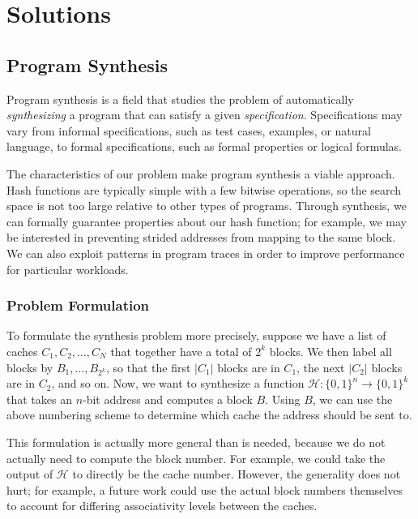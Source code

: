 \section{Solutions}
\label{sec:Solution}

\subsection{Program Synthesis}

Program synthesis \cite{program-synthesis-survey} is a field that studies the
problem of automatically \textit{synthesizing} a program that can satisfy a
given \textit{specification}. Specifications may vary from informal
specifications, such as test cases, examples, or natural language, to formal
specifications, such as formal properties or logical formulas.

The characteristics of our problem make program synthesis a viable approach.
Hash functions are typically simple with a few bitwise operations, so the search
space is not too large relative to other types of programs. Through synthesis,
we can formally guarantee properties about our hash function; for example, we
may be interested in preventing strided addresses from mapping to the same
block. We can also exploit patterns in program traces in order to improve
performance for particular workloads.

\subsubsection{Problem Formulation}

To formulate the synthesis problem more precisely, suppose we have a list of
caches $C_1, C_2, \dots, C_N$ that together have a total of $2^k$ blocks. We
then label all blocks by $B_1, \dots, B_{2^k}$, so that the first $|C_1|$ blocks
are in $C_1$, the next $|C_2|$ blocks are in $C_2$, and so on. Now, we want to
synthesize a function $\mathcal{H} : \{0,1\}^n \to \{0,1\}^k$ that takes an $n$-bit
address and computes a block $B$. Using $B$, we can use the above numbering
scheme to determine which cache the address should be sent to.

This formulation is actually more general than is needed, because we do not
actually need to compute the block number. For example, we could take the output
of $\mathcal{H}$ to directly be the cache number. However, the generality does
not hurt; for example, a future work could use the actual block numbers
themselves to account for differing associativity levels between the caches.

